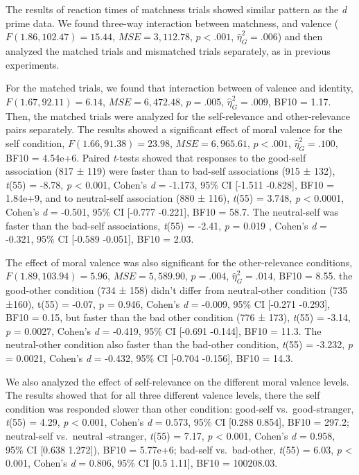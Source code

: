 \documentclass[
  english,
  man]{apa6}
\begin{document}
The results of reaction times of matchness trials showed similar pattern as the \emph{d} prime data. We found three-way interaction between matchness, and valence (\(F(1.86, 102.47) = 15.44\), \(\mathit{MSE} = 3,112.78\), \(p < .001\), \(\hat{\eta}^2_G = .006\)) and then analyzed the matched trials and mismatched trials separately, as in previous experiments.

For the matched trials, we found that interaction between of valence and identity, \(F(1.67, 92.11) = 6.14\), \(\mathit{MSE} = 6,472.48\), \(p = .005\), \(\hat{\eta}^2_G = .009\), BF10 = 1.17. Then, the matched trials were analyzed for the self-relevance and other-relevance pairs separately. The results showed a significant effect of moral valence for the self condition, \(F(1.66, 91.38) = 23.98\), \(\mathit{MSE} = 6,965.61\), \(p < .001\), \(\hat{\eta}^2_G = .100\), BF10 = 4.54e+6. Paired \emph{t}-tests showed that responses to the good-self association (817 ± 119) were faster than to bad-self associations (915 ± 132), \emph{t}(55) = -8.78, \emph{p} \textless{} 0.001, Cohen's \emph{d} = -1.173, 95\% CI {[}-1.511 -0.828{]}, BF10 = 1.84e+9, and to neutral-self association (880 ± 116), \emph{t}(55) = 3.748, \emph{p} \textless{} 0.0001, Cohen's \emph{d} = -0.501, 95\% CI {[}-0.777 -0.221{]}, BF10 = 58.7. The neutral-self was faster than the bad-self associations, \emph{t}(55) = -2.41, \emph{p} = 0.019 , Cohen's \emph{d} = -0.321, 95\% CI {[}-0.589 -0.051{]}, BF10 = 2.03.

The effect of moral valence was also significant for the other-relevance conditions, \(F(1.89, 103.94) = 5.96\), \(\mathit{MSE} = 5,589.90\), \(p = .004\), \(\hat{\eta}^2_G = .014\), BF10 = 8.55. the good-other condition (734 ± 158) didn't differ from neutral-other condition (735 ±160), t(55) = -0.07, p = 0.946, Cohen's \emph{d} = -0.009, 95\% CI {[}-0.271 -0.293{]}, BF10 = 0.15, but faster than the bad other condition (776 ± 173), \emph{t}(55) = -3.14, \emph{p} = 0.0027, Cohen's \emph{d} = -0.419, 95\% CI {[}-0.691 -0.144{]}, BF10 = 11.3. The neutral-other condition also faster than the bad-other condition, \emph{t}(55) = -3.232, \emph{p} = 0.0021, Cohen's \emph{d} = -0.432, 95\% CI {[}-0.704 -0.156{]}, BF10 = 14.3.

We also analyzed the effect of self-relevance on the different moral valence levels. The results showed that for all three different valence levels, there the self condition was responded slower than other condition: good-self vs.~good-stranger, \emph{t}(55) = 4.29, \emph{p} \textless{} 0.001, Cohen's \emph{d} = 0.573, 95\% CI {[}0.288 0.854{]}, BF10 = 297.2; neutral-self vs.~neutral -stranger, \emph{t}(55) = 7.17, \emph{p} \textless{} 0.001, Cohen's \emph{d} = 0.958, 95\% CI {[}0.638 1.272{]}), BF10 = 5.77e+6; bad-self vs.~bad-other, \emph{t}(55) = 6.03, \emph{p} \textless{} 0.001, Cohen's \emph{d} = 0.806, 95\% CI {[}0.5 1.11{]}, BF10 = 100208.03.
\end{document}
